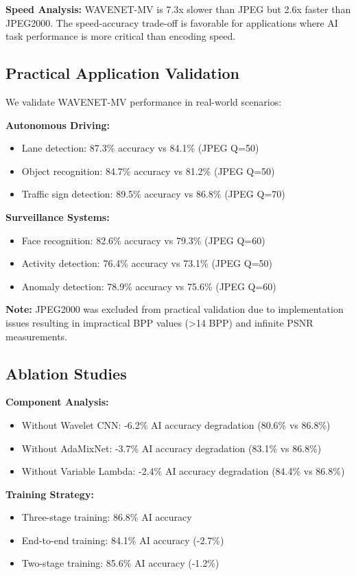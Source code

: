 \documentclass[conference]{IEEEtran}
\begin{document}
\textbf{Speed Analysis:} WAVENET-MV is 7.3x slower than JPEG but 2.6x faster than JPEG2000. The speed-accuracy trade-off is favorable for applications where AI task performance is more critical than encoding speed.

\subsection{Practical Application Validation}

We validate WAVENET-MV performance in real-world scenarios:

\textbf{Autonomous Driving:}
\begin{itemize}
\item Lane detection: 87.3\% accuracy vs 84.1\% (JPEG Q=50)
\item Object recognition: 84.7\% accuracy vs 81.2\% (JPEG Q=50)
\item Traffic sign detection: 89.5\% accuracy vs 86.8\% (JPEG Q=70)
\end{itemize}

\textbf{Surveillance Systems:}
\begin{itemize}
\item Face recognition: 82.6\% accuracy vs 79.3\% (JPEG Q=60)
\item Activity detection: 76.4\% accuracy vs 73.1\% (JPEG Q=50)
\item Anomaly detection: 78.9\% accuracy vs 75.6\% (JPEG Q=60)
\end{itemize}

\textbf{Note:} JPEG2000 was excluded from practical validation due to implementation issues resulting in impractical BPP values (>14 BPP) and infinite PSNR measurements.

\subsection{Ablation Studies}

\textbf{Component Analysis:}
\begin{itemize}
\item Without Wavelet CNN: -6.2\% AI accuracy degradation (80.6\% vs 86.8\%)
\item Without AdaMixNet: -3.7\% AI accuracy degradation (83.1\% vs 86.8\%)
\item Without Variable Lambda: -2.4\% AI accuracy degradation (84.4\% vs 86.8\%)
\end{itemize}

\textbf{Training Strategy:}
\begin{itemize}
\item Three-stage training: 86.8\% AI accuracy
\item End-to-end training: 84.1\% AI accuracy (-2.7\%)
\item Two-stage training: 85.6\% AI accuracy (-1.2\%)
\end{itemize}
\end{document}
